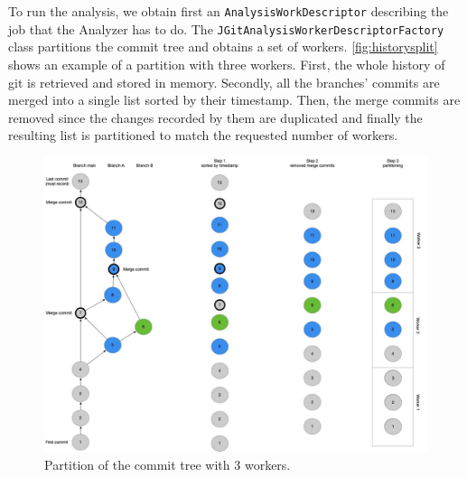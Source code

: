 To run the analysis, we obtain first an \texttt{AnalysisWorkDescriptor} describing the job that the Analyzer has to do. 
The \texttt{JGitAnalysisWorkerDescriptorFactory} class partitions the commit tree and obtains a set of workers. 
\autoref{fig:historysplit} shows an example of a partition with three workers. First, the whole history of git is retrieved and stored in memory. Secondly, all the branches' commits are merged into a single list sorted by their timestamp. 
Then, the merge commits are removed since the changes recorded by them are duplicated and finally the resulting list is partitioned to match the requested number of workers. 
\begin{figure}
    \center
    \includegraphics[width=\textwidth]{HistorySplit.jpg}
    \caption{Partition of the commit tree with 3 workers.}
    \label{fig:historysplit}
\end{figure}


